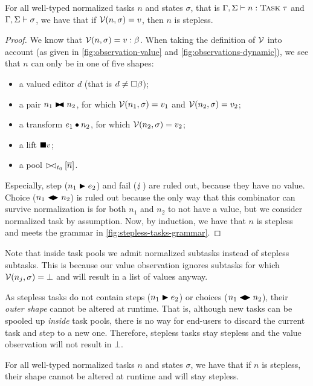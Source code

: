 \begin{proposition}
  \label{prp:valued-means-stepless}
  For all well-typed normalized tasks $n$ and states $\sigma$,
  that is $\Gamma,\Sigma \vdash n:{\text{\normalfont\sffamily\scshape Task}}\;\tau$ and $\Gamma,\Sigma \vdash \sigma$,
  we have that
    if $\mathcal{V}(n,\sigma) = v$,
    then $n$ is stepless.
\end{proposition}
\begin{proof}
  We know that $\mathcal{V}(n,\sigma) = v : \beta$.
  When taking the definition of $\mathcal{V}$ into account (as given in \cref{fig:observation-value} and \cref{fig:observations-dynamic}),
  we see that $n$ can only be in one of five shapes:
  \begin{itemize}
    \item a valued editor $d$ (that is $d \neq \square\beta$);
    \item a pair $n_1 \blacktriangleright\mkern-8mu\blacktriangleleft n_2$, for which $\mathcal{V}(n_1,\sigma) = v_1$ and $\mathcal{V}(n_2,\sigma) = v_2$;
    \item a transform $e_1 \bullet n_2$, for which $\mathcal{V}(n_2,\sigma) = v_2$;
    \item a lift $\blacksquare v$;
    \item a pool $\rhd\mkern-8mu\lhd_{t_0} [\overline{n}]$.
  \end{itemize}
  Especially, step ($n_1 \blacktriangleright e_2$) and fail ($\lightning$) are ruled out, because they have no value.
  Choice ($n_1 \blacktriangleleft\mkern-4mu\blacktriangleright n_2$) is ruled out
  because the only way that this combinator can survive normalization is for both $n_1$ and $n_2$ to not have a value,
  but we consider normalized task by assumption.
  Now, by induction, we have that $n$ is stepless and meets the grammar in \cref{fig:stepless-tasks-grammar}.
\end{proof}

Note that inside task pools we admit normalized subtasks instead of stepless subtasks.
This is because our value observation ignores subtasks for which $\mathcal{V}(n_j,\sigma) = \bot$
and will result in a list of values anyway.

As stepless tasks do not contain steps ($n_1 \blacktriangleright e_2$) or choices ($n_1 \blacktriangleleft\mkern-4mu\blacktriangleright n_2$),
their \emph{outer shape} cannot be altered at runtime.
That is, although new tasks can be spooled up \emph{inside} task pools,
there is no way for end-users to discard the current task
and step to a new one.
Therefore, stepless tasks stay stepless and the value observation will not result in $\bot$.

\begin{corollary}
  \label{cor:stepless-stays-stepless}
  For all well-typed normalized tasks $n$ and states $\sigma$,
  we have that
    if $n$ is stepless,
    their shape cannot be altered at runtime
    and will stay stepless.
\end{corollary}

